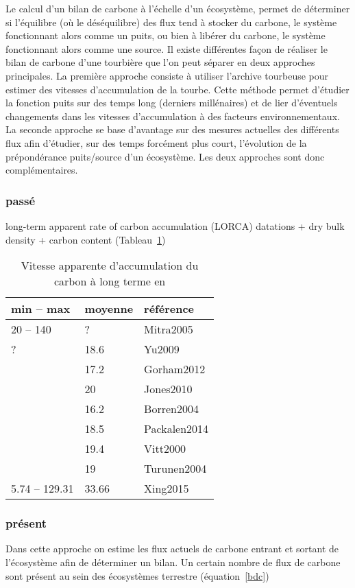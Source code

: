 Le calcul d'un bilan de carbone à l'échelle d'un écosystème, permet de déterminer si l'équilibre (où le déséquilibre) des flux tend à stocker du carbone, le système fonctionnant alors comme un puits, ou bien à libérer du carbone, le système fonctionnant alors comme une source.
Il existe différentes façon de réaliser le bilan de carbone d'une tourbière que l'on peut séparer en deux approches principales.
La première approche consiste à utiliser l'archive tourbeuse pour estimer des vitesses d'accumulation de la tourbe.
Cette méthode permet d'étudier la fonction puits sur des temps long (derniers millénaires) et de lier d'éventuels changements dans les vitesses d'accumulation à des facteurs environnementaux.
La seconde approche se base d'avantage sur des mesures actuelles des différents flux afin d'étudier, sur des temps forcément plus court, l'évolution de la prépondérance puits/source d'un écosystème.
Les deux approches sont donc complémentaires.

\subsubsection{passé}
long-term apparent rate of carbon accumulation (LORCA) 
datations + dry bulk density + carbon content
(Tableau~\ref{table:lorca})

\begin{table}
\centering
\caption{Vitesse apparente d'accumulation du carbon à long terme en \si{\gcms}}
\label{table:lorca}
\begin{tabular}{llp{7cm}}\toprule
min -- max & moyenne & référence \\ \midrule
20 -- 140  & ? & Mitra2005 \\ %
? & 18.6 &  Yu2009\\  %
 & 17.2 & Gorham2012 \\  %
 & 20 & Jones2010\\  %
 & 16.2 & Borren2004\\  %
 & 18.5 & Packalen2014\\ %
 & 19.4 & Vitt2000\\ %
 & 19 & Turunen2004\\ %
5.74 -- 129.31 & 33.66 & Xing2015\\
\bottomrule
\end{tabular}
\end{table}


\subsubsection{présent}
Dans cette approche on estime les flux actuels de carbone entrant et sortant de l'écosystème afin de déterminer un bilan.
Un certain nombre de flux de carbone sont présent au sein des écosystèmes terrestre (équation~\eqref{bdc})

